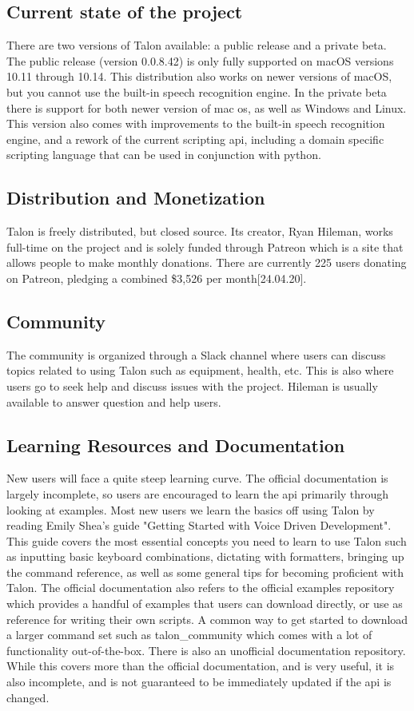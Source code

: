 \documentclass[a4paper,english]{ifimaster}
\begin{document}
\subsection{Current state of the project}
There are two versions of Talon available: a public release and a private beta.
The public release (version 0.0.8.42) is only fully supported on macOS versions 10.11 through 10.14.
This distribution also works on newer versions of macOS, but you cannot use the built-in speech recognition engine.
In the private beta there is support for both newer version of mac os, as well as Windows and Linux.
This version also comes with improvements to the built-in speech recognition engine, and a rework of the current scripting api, including a domain specific scripting language that can be used in conjunction with python.


\subsection{Distribution and Monetization}
Talon is freely distributed, but closed source.
Its creator, Ryan Hileman, works full-time on the project and is solely funded through Patreon which is a site that allows people to make monthly donations.
There are currently 225 users donating on Patreon, pledging a combined \$3,526 per month[24.04.20].

\subsection{Community}
The community is organized through a Slack channel where users can discuss topics related to using Talon such as equipment, health, etc.
This is also where users go to seek help and discuss issues with the project.
Hileman is usually available to answer question and help users.

\subsection{Learning Resources and Documentation}
New users will face a quite steep learning curve.
The official documentation is largely incomplete, so users are encouraged to learn the api primarily through looking at examples.
Most new users we learn the basics off using Talon by reading Emily Shea's guide "Getting Started with Voice Driven Development".
This guide covers the most essential concepts you need to learn to use Talon such as inputting basic keyboard combinations, dictating with formatters, bringing up the command reference, as well as some general tips for becoming proficient with Talon.
The official documentation also refers to the official examples repository which provides a handful of examples that users can download directly, or use as reference for writing their own scripts.
A common way to get started to download a larger command set such as talon\_community which comes with a lot of functionality out-of-the-box.
There is also an unofficial documentation repository.
While this covers more than the official documentation, and is very useful, it is also incomplete, and is not guaranteed to be immediately updated if the api is changed.
\end{document}

